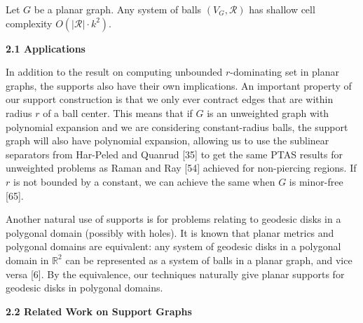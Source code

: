 Let $G$ be a planar graph. Any system of balls $(V_{G},\mathcal{R})$ has shallow cell complexity $O(|\mathcal{R}|\cdot k^{2})$.
\par
\par
\par
\par\medskip\noindent\textbf{2.1 Applications}\par
In addition to the result on computing unbounded $r$-dominating set in planar graphs, the supports also have their own implications. An important property of our support construction is that we only ever contract edges that are within radius $r$ of a ball center. This means that if $G$ is an unweighted graph with polynomial expansion and we are considering constant-radius balls, the support graph will also have polynomial expansion, allowing us to use the sublinear separators from Har-Peled and Quanrud [35] to get the same PTAS results for unweighted problems as Raman and Ray [54] achieved for non-piercing regions. If $r$ is not bounded by a constant, we can achieve the same when $G$ is minor-free [65].
\par
\par
Another natural use of supports is for problems relating to geodesic disks in a polygonal domain (possibly with holes). It is known that planar metrics and polygonal domains are equivalent: any system of geodesic disks in a polygonal domain in $\mathbb{R}^{2}$ can be represented as a system of balls in a planar graph, and vice versa [6]. By the equivalence, our techniques naturally give planar supports for geodesic disks in polygonal domains.
\par
\par
\par\medskip\noindent\textbf{2.2 Related Work on Support Graphs}\par
